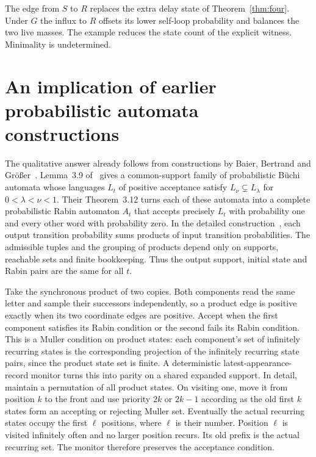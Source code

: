 \documentclass[11pt]{amsart}
\begin{document}
The edge from \(S\) to \(R\) replaces the extra delay state of Theorem~\ref{thm:four}. Under \(G\) the influx to \(R\) offsets its lower self-loop probability and balances the two live masses. The example reduces the state count of the explicit witness. Minimality is undetermined.

\section{An implication of earlier probabilistic automata constructions}
The qualitative answer already follows from constructions by Baier, Bertrand and Gr\"o{\ss}er~\cite{BBGpre,BBG}. Lemma~3.9 of~\cite{BBGpre} gives a common-support family of probabilistic B\"uchi automata whose languages \(L_t\) of positive acceptance satisfy \(L_\nu\subsetneq L_\lambda\) for \(0<\lambda<\nu<1\). Their Theorem~3.12 turns each of these automata into a complete probabilistic Rabin automaton \(A_t\) that accepts precisely \(L_t\) with probability one and every other word with probability zero. In the detailed construction~\cite[Theorem~4.3.2, pp.~78--79]{G}, each output transition probability sums products of input transition probabilities. The admissible tuples and the grouping of products depend only on supports, reachable sets and finite bookkeeping. Thus the output support, initial state and Rabin pairs are the same for all \(t\).

Take the synchronous product of two copies. Both components read the same letter and sample their successors independently, so a product edge is positive exactly when its two coordinate edges are positive. Accept when the first component satisfies its Rabin condition or the second fails its Rabin condition. This is a Muller condition on product states: each component's set of infinitely recurring states is the corresponding projection of the infinitely recurring state pairs, since the product state set is finite. A deterministic latest-appearance-record monitor turns this into parity on a shared expanded support. In detail, maintain a permutation of all product states. On visiting one, move it from position \(k\) to the front and use priority \(2k\) or \(2k-1\) according as the old first \(k\) states form an accepting or rejecting Muller set. Eventually the actual recurring states occupy the first \(\ell\) positions, where \(\ell\) is their number. Position \(\ell\) is visited infinitely often and no larger position recurs. Its old prefix is the actual recurring set. The monitor therefore preserves the acceptance condition.
\end{document}

